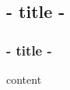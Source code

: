 \subsection{ {{- title -}} }
\begin{frame}
  \frametitle{ {{- title -}} }
  {{ content }}
\end{frame}
